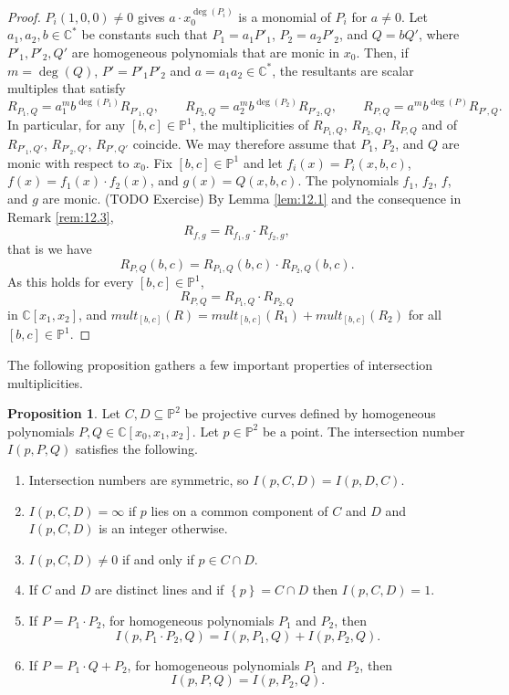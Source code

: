 \documentclass{article}
\newcommand{\C}{\mathbb{C}}
\renewcommand{\P}{\mathbb{P}}
\newcommand{\rb}[1]{\left( #1 \right)}
\renewcommand{\sb}[1]{\left[ #1 \right]}
\newcommand{\cb}[1]{\left\{ #1 \right\}}
\theoremstyle{definition}\newtheorem{definition}{Definition}[section]
\theoremstyle{definition}\newtheorem{notation}[definition]{Notation}
\theoremstyle{definition}\newtheorem{remark}[definition]{Remark}
\theoremstyle{definition}\newtheorem{example}[definition]{Example}
\theoremstyle{definition}\newtheorem{fact}{Fact}
\theoremstyle{definition}\newtheorem{exercise}{Exercise}
\newtheorem{proposition}[definition]{Proposition}
\begin{document}
\begin{proof}
$ P_i\rb{1, 0, 0} \ne 0 $ gives $ a \cdot x_0^{\deg\rb{P_i}} $ is a monomial of $ P_i $ for $ a \ne 0 $. Let $ a_1, a_2, b \in \C^* $ be constants such that $ P_1 = a_1P'_1 $, $ P_2 = a_2P'_2 $, and $ Q = bQ' $, where $ P'_1, P'_2, Q' $ are homogeneous polynomials that are monic in $ x_0 $. Then, if $ m = \deg\rb{Q} $, $ P' = P'_1P'_2 $ and $ a = a_1a_2 \in \C^* $, the resultants are scalar multiples that satisfy
$$ R_{P_1, Q} = a_1^mb^{\deg\rb{P_1}}R_{P'_1, Q}, \qquad R_{P_2, Q} = a_2^mb^{\deg\rb{P_2}}R_{P'_2, Q}, \qquad R_{P, Q} = a^mb^{\deg\rb{P}}R_{P', Q}. $$
In particular, for any $ \sb{b, c} \in \P^1 $, the multiplicities of $ R_{P_1, Q} $, $ R_{P_2, Q} $, $ R_{P, Q} $ and of $ R_{P'_1, Q'} $, $ R_{P'_2, Q'} $, $ R_{P', Q'} $ coincide. We may therefore assume that $ P_1 $, $ P_2 $, and $ Q $ are monic with respect to $ x_0 $. Fix $ \sb{b, c} \in \P^1 $ and let $ f_i\rb{x} = P_i\rb{x, b, c} $, $ f\rb{x} = f_1\rb{x} \cdot f_2\rb{x} $, and $ g\rb{x} = Q\rb{x, b, c} $. The polynomials $ f_1 $, $ f_2 $, $ f $, and $ g $ are monic. (TODO Exercise) By Lemma \ref{lem:12.1} and the consequence in Remark \ref{rem:12.3},
$$ R_{f, g} = R_{f_1, g} \cdot R_{f_2, g}, $$
that is we have
$$ R_{P, Q}\rb{b, c} = R_{P_1, Q}\rb{b, c} \cdot R_{P_2, Q}\rb{b, c}. $$
As this holds for every $ \sb{b, c} \in \P^1 $,
$$ R_{P, Q} =  R_{P_1, Q} \cdot R_{P_2, Q} $$
in $ \C\sb{x_1, x_2} $, and $ mult_{\sb{b, c}}\rb{R} = mult_{\sb{b, c}}\rb{R_1} + mult_{\sb{b, c}}\rb{R_2} $ for all $ \sb{b, c} \in \P^1 $.
\end{proof}

The following proposition gathers a few important properties of intersection multiplicities.

\begin{proposition}
Let $ C, D \subseteq \P^2 $ be projective curves defined by homogeneous polynomials $ P, Q \in \C\sb{x_0, x_1, x_2} $. Let $ p \in \P^2 $ be a point. The intersection number $ I\rb{p, P, Q} $ satisfies the following.
\begin{enumerate}
\item Intersection numbers are symmetric, so $ I\rb{p, C, D} = I\rb{p, D, C} $.
\item $ I\rb{p, C, D} = \infty $ if $ p $ lies on a common component of $ C $ and $ D $ and $ I\rb{p, C, D} $ is an integer otherwise.
\item $ I\rb{p, C, D} \ne 0 $ if and only if $ p \in C \cap D $.
\item If $ C $ and $ D $ are distinct lines and if $ \cb{p} = C \cap D $ then $ I\rb{p, C, D} = 1 $.
\item If $ P = P_1 \cdot P_2 $, for homogeneous polynomials $ P_1 $ and $ P_2 $, then
$$ I\rb{p, P_1 \cdot P_2, Q} = I\rb{p, P_1, Q} + I\rb{p, P_2, Q}. $$
\item If $ P = P_1 \cdot Q + P_2 $, for homogeneous polynomials $ P_1 $ and $ P_2 $, then
$$ I\rb{p, P, Q} = I\rb{p, P_2, Q}. $$
\end{enumerate}
\end{proposition}
\end{document}
